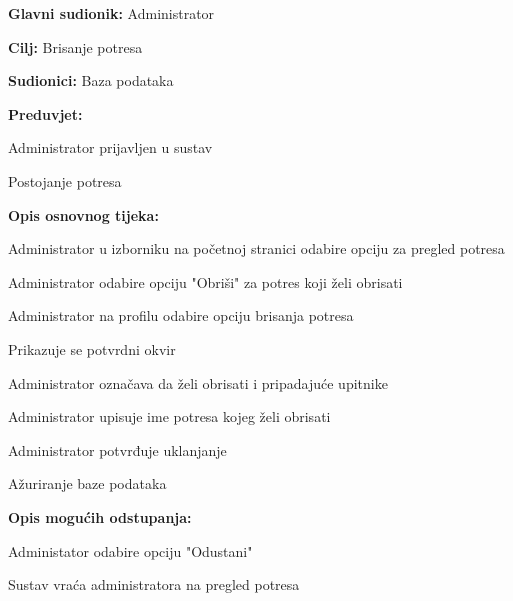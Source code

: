 			\noindent {}
			\begin{packed_item}

				\item \textbf{Glavni sudionik:} Administrator
				\item \textbf{Cilj:} Brisanje potresa
				\item \textbf{Sudionici:} Baza podataka
				\item \textbf{Preduvjet:}
					\begin{packed_item}
						\item Administrator prijavljen u sustav
						\item Postojanje potresa
					\end{packed_item}
				\item \textbf{Opis osnovnog tijeka:}
				
				\item[] \begin{packed_enum}

					\item Administrator u izborniku na početnoj stranici odabire opciju za pregled potresa
					\item Administrator odabire opciju "Obriši" za potres koji želi obrisati
					\item Administrator na profilu odabire opciju brisanja potresa
					\item Prikazuje se potvrdni okvir
					\item Administrator označava da želi obrisati i pripadajuće upitnike
					\item Administrator upisuje ime potresa kojeg želi obrisati
					\item Administrator potvrđuje uklanjanje
					\item Ažuriranje baze podataka
					
				\end{packed_enum}
				
				\item  \textbf{Opis mogućih odstupanja:}
				
				\item[] \begin{packed_item}
				 
					\item[7.a] Administator odabire opciju "Odustani"
					\item[] \begin{packed_enum}
						
						\item Sustav vraća administratora na pregled potresa
						
						\end{packed_enum}
					
				\end{packed_item}
			\end{packed_item}

